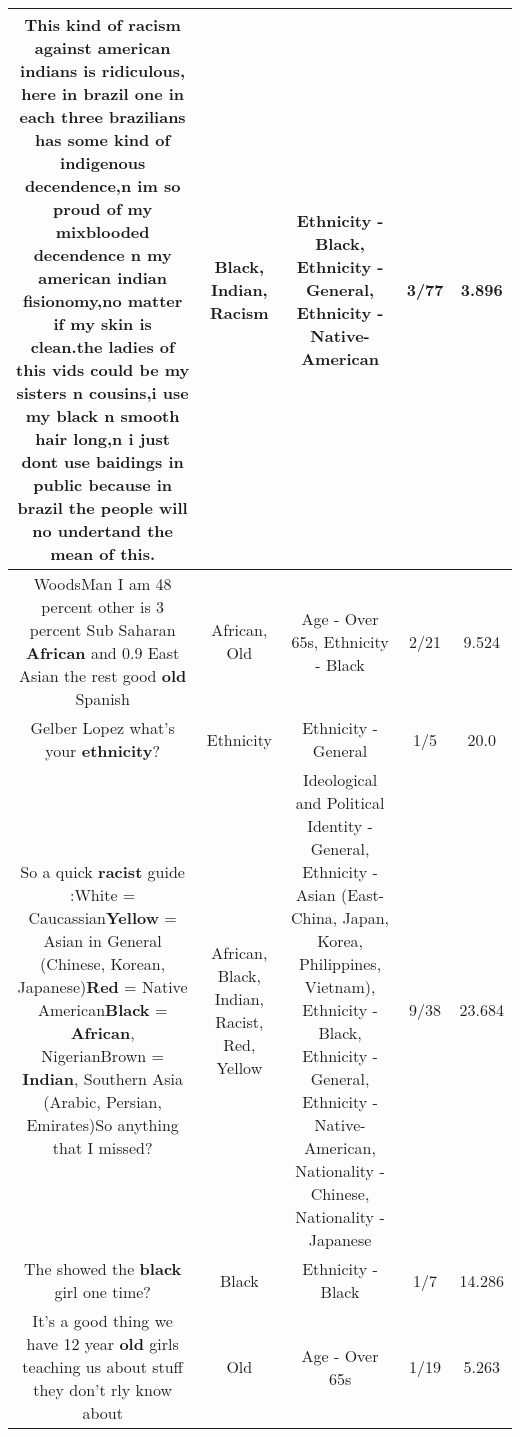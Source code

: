 \documentclass[11pt]{article}
\newlength\mylength
\begin{document}
\begin{center}
\begin{longtable}{|C{.65\mylength}|C{.30\mylength}|C{.12\mylength}|C{.12\mylength}|C{.12\mylength}|}
  \small This kind of \textbf{racism} against american indians is ridiculous, here in brazil one in each three brazilians has some kind of indigenous decendence,n im so proud of my mixblooded decendence n my american \textbf{indian} fisionomy,no matter if my skin is clean.the ladies of this vids could be my sisters n cousins,i use my \textbf{black} n smooth hair long,n i just dont use baidings in public because in brazil the people will no undertand the mean of this.\normalsize   & Black, Indian, Racism & Ethnicity - Black, Ethnicity - General, Ethnicity - Native-American & 3/77 & 3.896 \\  \hline
  \small WoodsMan I am 48 percent other is 3 percent Sub Saharan \textbf{African} and 0.9 East Asian the rest good \textbf{old} Spanish\normalsize   & African, Old & Age - Over 65s, Ethnicity - Black & 2/21 & 9.524 \\  \hline
  \small Gelber Lopez what's your \textbf{ethnicity}?\normalsize   & Ethnicity & Ethnicity - General & 1/5 & 20.0 \\  \hline
  \small So a quick \textbf{racist} guide :White = Caucassian\textbf{Y\textbf{e\textbf{llow}}} = Asian in General (Chinese, Korean, Japanese)\textbf{R\textbf{ed}} = Native American\textbf{Black} = \textbf{African}, NigerianBrown = \textbf{Indian}, Southern Asia (Arabic, Persian, Emirates)So anything that I missed?\normalsize   & African, Black, Indian, Racist, Red, Yellow &  Ideological and Political Identity - General, Ethnicity - Asian (East- China, Japan, Korea, Philippines, Vietnam), Ethnicity - Black, Ethnicity - General, Ethnicity - Native-American, Nationality - Chinese, Nationality - Japanese & 9/38 & 23.684 \\  \hline
  \small The showed the \textbf{black} girl one time?\normalsize   & Black & Ethnicity - Black & 1/7 & 14.286 \\  \hline
  \small It's a good thing we have 12 year \textbf{old} girls teaching us about stuff they don't rly know about\normalsize   & Old & Age - Over 65s & 1/19 & 5.263 \\  \hline

\end{longtable}
\end{center}
\end{document}

